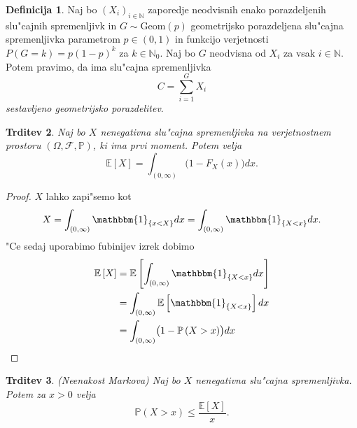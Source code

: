 \documentclass[12pt, a4paper, reqno]{amsart}
\theoremstyle{definition}
\newtheorem{definicija}{Definicija}[section]
\theoremstyle{plain}
\newtheorem{trditev}[definicija]{Trditev}
\newcommand{\N}{\mathbb{N}}
\newcommand{\E}{\mathbb{E}}
\newcommand{\Prob}{\mathbb{P}}
\newcommand{\1}{\mathds{1}}
\begin{document}
    \begin{definicija}
        Naj bo $(X_i)_{i\in\N}$ zaporedje neodvisnih enako porazdeljenih slu"cajnih spremenljivk in 
        $G \sim \text{Geom}(p)$ geometrijsko porazdeljena slu"cajna spremenljivka  parametrom $p\in(0, 1)$ in 
        funkcijo verjetnosti $P(G = k) = p(1 - p)^{k}$ za $k\in\N_0$.
        Naj bo $G$ neodvisna od $X_i$ za vsak $i\in\N$. Potem pravimo, da ima slu"cajna spremenljivka
        \begin{equation*}
            C = \sum_{i= 1}^{G} X_i
        \end{equation*}
        \textit{sestavljeno geometrijsko porazdelitev}.
        \label{def:CompoundGeometricDistribution}
    \end{definicija}

    \begin{trditev}
        Naj bo $X$ nenegativna slu"cajna spremenljivka na verjetnostnem prostoru $(\Omega, \mathcal{F}, \Prob)$, 
        ki ima prvi moment. Potem velja 
        \begin{equation*}
            \E\left[X\right] = \int_{(0, \infty)}\bigl(1 - F_X(x)\bigr)dx.
        \end{equation*}
        \label{trd:PricakovanaVrednostZPrezivetveno}
    \end{trditev}

    \begin{proof}
        $X$ lahko zapi"semo kot 
        \begin{equation*}
            X = \int_{(0, \infty)}\mathbbm{1}_{\{x < X\}}dx = \int_{(0, \infty)}\mathbbm{1}_{\{X < x\}}dx.
        \end{equation*}
        "Ce sedaj uporabimo fubinijev izrek dobimo
        \begin{align*}
            \E\left[X\right] &= \E\left[\int_{(0, \infty)}\mathbbm{1}_{\{X < x\}}dx\right] \\
                             &= \int_{(0, \infty)}\E\left[\mathbbm{1}_{\{X < x\}}\right]dx \\
                             &= \int_{(0, \infty)}\bigl(1 - \Prob\left(X > x\right)\bigr)dx \\
        \end{align*}
    \end{proof}

    \begin{trditev}(Neenakost Markova)
        \label{trd:neenakostMarkova}
        Naj bo $X$ nenegativna slu"cajna spremenljivka.
        Potem za  $x>0$ velja
        \begin{equation*}
            \Prob\left(X > x\right) \leq \frac{\E\left[X\right]}{x}.
        \end{equation*}
    \end{trditev}
\end{document}
